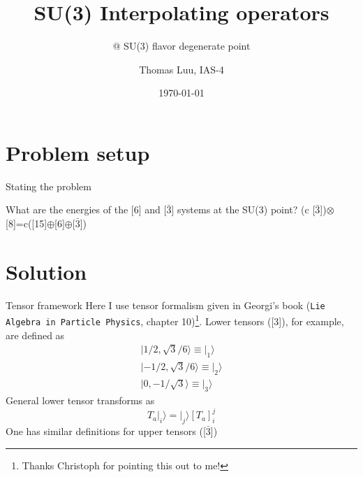 \documentclass{beamer}
\title{SU(3) Interpolating operators}
\subtitle{@ SU(3) flavor degenerate point}
\author{Thomas Luu, IAS-4}
\date{\today}
\begin{document}
\maketitle

\section{Problem setup}
\begin{frame}{Stating the problem}
\begin{block}{What are the energies of the [6] and [$\bar{3}$] systems at the SU(3) point?}
\center
(c [$\bar{3}$])$\otimes$[8]=c([15]$\oplus$[6]$\oplus$[$\bar{3}$])

\end{block}
\end{frame}

\section{Solution}
\begin{frame}{Tensor framework}
\footnotesize
Here I use tensor formalism given in Georgi's book (\texttt{Lie Algebra in Particle Physics}, chapter 10)\footnote{Thanks Christoph for pointing this out to me!}.  Lower tensors ([3]), for example, are defined as
\begin{displaymath}
\left. \begin{array} { l } { | 1 / 2 , \sqrt { 3 } / 6 \rangle \left. \equiv \right| _ { 1 } \rangle } \\ { | - 1 / 2 , \sqrt { 3 } / 6 \rangle \left. \equiv \right| _ { 2 } \rangle } \\ { | 0 , - 1 / \sqrt { 3 } \rangle \left. \equiv \right| _ { 3 } \rangle } \end{array} \right.
\end{displaymath}
General lower tensor transforms as
\begin{displaymath}
\left. T _ { a } \right| _ { i } \rangle =\left. \right| _ { j } \rangle \left[ T _ { a } \right] _ { i } ^ { j }
\end{displaymath}
One has similar definitions for upper tensors ([$\bar{3}$])
\end{frame}
\end{document}
